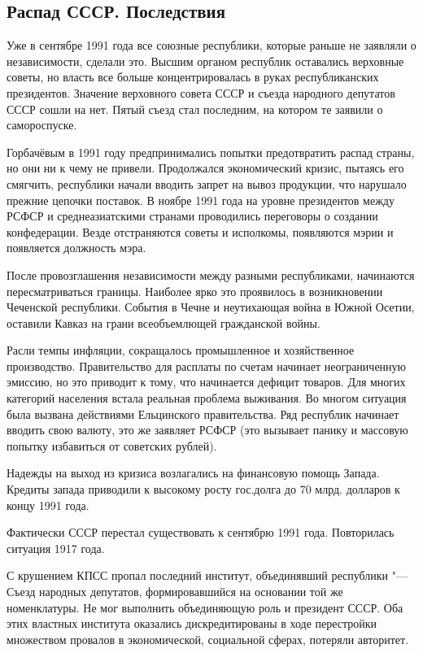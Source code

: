 \subsection{Распад СССР. Последствия}
Уже в сентябре 1991 года все союзные республики, которые раньше не заявляли о независимости, сделали это. Высшим органом республик оставались верховные советы, но власть все больше концентрировалась в руках республиканских президентов. Значение верховного совета СССР и съезда народного депутатов СССР сошли на нет. Пятый съезд стал последним, на котором те заявили о самороспуске. 

Горбачёвым в 1991 году предпринимались попытки предотвратить распад страны, но они ни к чему не привели. Продолжался экономический кризис, пытаясь его смягчить, республики начали вводить запрет на вывоз продукции, что нарушало прежние цепочки поставок. В ноябре 1991 года на уровне президентов между РСФСР и среднеазиатскими странами проводились переговоры о создании конфедерации.
Везде отстраняются советы и исполкомы, появляются мэрии и появляется должность мэра.

После провозглашения независимости между разными республиками, начинаются пересматриваться границы. Наиболее ярко это проявилось в возникновении Чеченской республики. События в Чечне и неутихающая война в Южной Осетии, оставили Кавказ на грани всеобъемлющей гражданской войны.

Расли темпы инфляции, сокращалось промышленное и хозяйственное производство. Правительство для расплаты по счетам начинает неограниченную эмиссию, но это приводит к тому, что начинается дефицит товаров. Для многих категорий населения встала реальная проблема выживания. Во многом ситуация была вызвана действиями Ельцинского правительства. Ряд республик начинает вводить свою валюту, это же заявляет РСФСР (это вызывает панику и массовую попытку избавиться от советских рублей).

Надежды на выход из кризиса возлагались на финансовую помощь Запада. Кредиты запада приводили к высокому росту гос.долга до 70 млрд. долларов к концу 1991 года.

Фактически СССР перестал существовать к сентябрю 1991 года. Повторилась ситуация 1917 года.

С крушением КПСС пропал последний институт, объединявший республики "--- Съезд народных депутатов, формировавшийся на основании той же номенклатуры. Не мог выполнить объединяющую роль и президент СССР. Оба этих властных института оказались дискредитированы в ходе перестройки множеством провалов в экономической, социальной сферах, потеряли авторитет.

